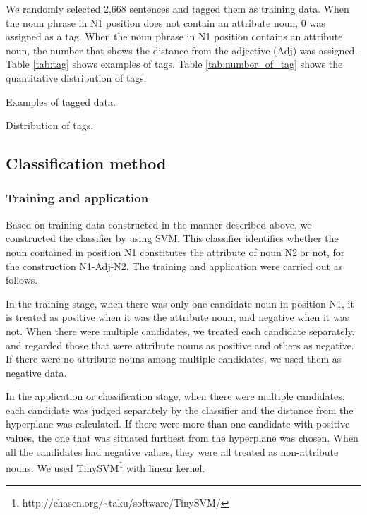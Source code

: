 \documentclass[english]{jnlp_1.4}
\begin{document}
We randomly selected 2,668 sentences and tagged them as training data.
When the noun phrase in N1 position does not contain an attribute noun, 0 
was assigned as a tag. When the noun phrase in N1 position contains an 
attribute noun, the number that shows the distance from the adjective (Adj) 
was assigned. Table \ref{tab:tag} shows examples of tags. Table
\ref{tab:number_of_tag}
 shows the quantitative
distribution of tags.

\begin{table}[b]
  \caption{Examples of tagged data.}
  \label{tab:tag}

\end{table}

\begin{table}[t]
  \caption{Distribution of tags.}
  \label{tab:number_of_tag}

\end{table}


\subsection{Classification method}

\subsubsection{Training and application}

Based on training data constructed in the manner described above, we 
constructed the classifier by using SVM. This classifier identifies 
whether the noun 
contained in position N1 constitutes the attribute of noun N2 or not,
for the construction N1-Adj-N2. The training and application were
carried out as follows.

In the training stage, when there was only one candidate noun in position
N1, it is treated as positive when it was the attribute noun, and negative
when it was not. When there were multiple candidates, we treated each candidate
separately, and regarded those that were attribute nouns as positive and others
as negative. If there were no attribute nouns among multiple candidates,
we used them as negative data.

In the application or classification stage, when there were multiple candidates, 
each candidate was judged separately by the classifier and the distance from 
the hyperplane was calculated. If there were more than one candidate with 
positive values, the one that was situated furthest from the hyperplane 
was chosen. When all the candidates had negative values, they were all 
treated as non-attribute nouns.
We used TinySVM\footnote{http://chasen.org/\~{}taku/software/TinySVM/} with 
linear kernel. 
\end{document}
